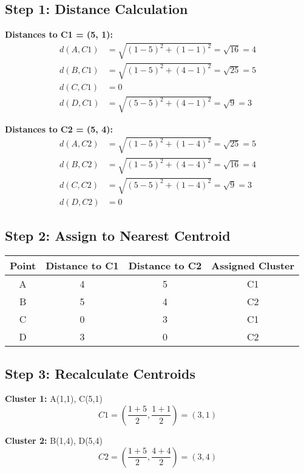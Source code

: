 \documentclass{article}
\begin{document}
\subsection*{Step 1: Distance Calculation}

\textbf{Distances to C1 = (5, 1):}
\begin{align*}
d(A, C1) &= \sqrt{(1 - 5)^2 + (1 - 1)^2} = \sqrt{16} = 4 \\
d(B, C1) &= \sqrt{(1 - 5)^2 + (4 - 1)^2} = \sqrt{25} = 5 \\
d(C, C1) &= 0 \\
d(D, C1) &= \sqrt{(5 - 5)^2 + (4 - 1)^2} = \sqrt{9} = 3
\end{align*}

\textbf{Distances to C2 = (5, 4):}
\begin{align*}
d(A, C2) &= \sqrt{(1 - 5)^2 + (1 - 4)^2} = \sqrt{25} = 5 \\
d(B, C2) &= \sqrt{(1 - 5)^2 + (4 - 4)^2} = \sqrt{16} = 4 \\
d(C, C2) &= \sqrt{(5 - 5)^2 + (1 - 4)^2} = \sqrt{9} = 3 \\
d(D, C2) &= 0
\end{align*}

\subsection*{Step 2: Assign to Nearest Centroid}

\begin{center}
\begin{tabular}{cccc}
\toprule
Point & Distance to C1 & Distance to C2 & Assigned Cluster \\
\midrule
A & 4 & 5 & C1 \\
B & 5 & 4 & C2 \\
C & 0 & 3 & C1 \\
D & 3 & 0 & C2 \\
\bottomrule
\end{tabular}
\end{center}

\subsection*{Step 3: Recalculate Centroids}

\textbf{Cluster 1:} A(1,1), C(5,1)
\[
C1 = \left( \frac{1 + 5}{2}, \frac{1 + 1}{2} \right) = (3, 1)
\]

\textbf{Cluster 2:} B(1,4), D(5,4)
\[
C2 = \left( \frac{1 + 5}{2}, \frac{4 + 4}{2} \right) = (3, 4)
\]
\end{document}
